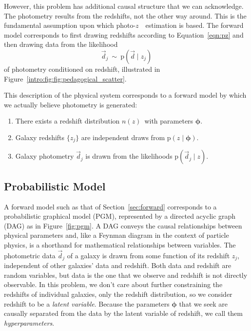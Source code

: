 \documentclass[iop]{emulateapj}
\newcommand{\Sect}[1]{Section~\ref{#1}}
\newcommand{\Eq}[1]{Equation~\ref{#1}}
\newcommand{\Fig}[1]{Figure~\ref{#1}}
\newcommand{\nz}{$n(z)$}
\newcommand{\data}{\ensuremath{\vec{d}}}
\newcommand{\pr}[1]{\ensuremath{\mathrm{p}(#1)}}
\newcommand{\gvn}{\mid}%
\newcommand{\pz}{photo-$z$~}
\newcommand{\bvec}[1]{{\ensuremath{\boldsymbol{#1}}}}
\newcommand{\ndphi}{\bvec{\phi}}
\begin{document}
However, this problem has additional causal structure that we can acknowledge.
The photometry results from the redshifts, not the other way around.
This is the fundamental assumption upon which \pz\ estimation is based.
The forward model corresponds to first drawing redshifts according to 
\Eq{eqn:pz} and then drawing data from the likelihood
\begin{equation}
\label{eqn:pzpdf}
\data_{j}\ \sim\ \pr{\data \gvn z_{j}}
\end{equation}
of photometry conditioned on redshift, illustrated in 
Figure~\ref{intro:fig:fig:pedagogical_scatter}.

This description of the physical system corresponds to a forward model by which 
we actually believe photometry is generated:
\begin{enumerate}
	\item There exists a redshift distribution \nz\ with parameters 
$\ndphi$.
	\item Galaxy redshifts $\{z_{j}\}$ are independent draws from $\pr{z 
\gvn \ndphi}$.
	\item Galaxy photometry $\data_{j}$ is drawn from the likelihoods 
$\pr{\data_{j} \gvn z}$.
\end{enumerate}

\subsection{Probabilistic Model}
\label{sec:prob}

A forward model such as that of \Sect{sec:forward} corresponds to a 
probabilistic graphical model (PGM), represented by a directed acyclic graph 
(DAG) as in \Fig{fig:pgm}.
A DAG conveys the causal relationships between physical parameters and, like a 
Feynman diagram in the context of particle physics, is a shorthand for 
mathematical relationships between variables.
The photometric data $\data_{j}$ of a galaxy is drawn from some function of its 
redshift $z_{j}$, independent of other galaxies' data and redshift.
Both data and redshift are random variables, but data is the one that we 
observe and redshift is not directly observable.
In this problem, we don't care about further constraining the redshifts of 
individual galaxies, only the redshift distribution, so we consider redshift to 
be a \textit{latent variable}.
Because the parameters $\ndphi$ that we seek are causally separated from the 
data by the latent variable of redshift, we call them \textit{hyperparameters}.
\end{document}

